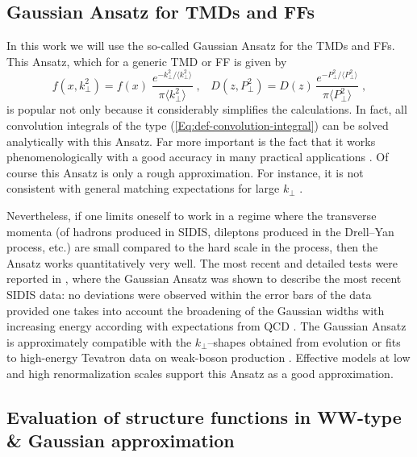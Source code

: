 \documentclass[a4paper,11pt]{article}
\newcommand{\be}{\begin{equation}}
\newcommand{\ee}{\end{equation}}
\newcommand{\la}{\langle}
\newcommand{\ra}{\rangle}
\def\kperp{k_\perp}
\def\pperp{P_\perp}
\def\avkperp{\la \kperp^2 \ra}
\def\avpperp{\la \pperp^2 \ra}
\begin{document}
\subsection{Gaussian Ansatz for TMDs and FFs}
\label{Sec-4.3:evaluation}

In this work we will use the so-called Gaussian Ansatz for the TMDs and FFs.
This Ansatz, which for a generic TMD or FF is given by
\be\label{Eq:Gauss-generic}
    f(x,\kperp^2) = f(x)\;
    \frac{e^{-\kperp^2/\avkperp}}{\pi\avkperp} \;,\;\;\;
    D(z,\pperp^2) = D(z)\,
    \frac{e^{-\pperp^2/\avpperp}}{\pi\avpperp}\;,
\ee
is popular not only because it considerably simplifies the
calculations. In fact, all convolution integrals of the type
(\ref{Eq:def-convolution-integral}) can be solved analytically
with this Ansatz. Far more important is the fact that it works
phenomenologically with a good accuracy in many practical applications
\cite{Anselmino:2005nn,Collins:2005ie,D'Alesio:2007jt,Schweitzer:2010tt,
Signori:2013mda,Anselmino:2013lza}.
Of course this Ansatz is only a rough approximation. For instance,
it is not consistent with general matching expectations for large
$\kperp$ \cite{Bacchetta:2008xw}.

Nevertheless, if one limits oneself to work in a regime where the
transverse momenta (of hadrons produced in SIDIS, dileptons produced
in the Drell--Yan process, etc.) are small compared to the hard
scale in the process, then the Ansatz works quantitatively
very well. The most recent and detailed tests were reported in
\cite{Schweitzer:2010tt}, where the Gaussian Ansatz was shown to
describe the most recent SIDIS data: no deviations were observed
within the error bars of the data provided one takes into account
the broadening of the Gaussian widths with increasing energy
\cite{Schweitzer:2010tt} according
with expectations from QCD \cite{Aybat:2011zv}.
The Gaussian Ansatz is approximately compatible with
the $\kperp$--shapes obtained from evolution \cite{Aybat:2011zv}
or fits to high-energy Tevatron data on weak-boson production
\cite{Landry:2002ix}. Effective models at
low \cite{Pasquini:2008ax,Avakian:2010br,Lorce:2011dv} and
high \cite{Efremov:2009ze} renormalization scales support this
Ansatz as a good approximation.

\subsection{Evaluation of structure functions in WW-type \&
 Gaussian approximation}
\label{Sec-4.4:evaluation}
\end{document}

